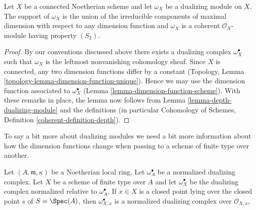 \begin{lemma}
\label{lemma-dualizing-module}
Let $X$ be a connected Noetherian scheme and let $\omega_X$ be a dualizing
module on $X$. The support of $\omega_X$ is the union of the irreducible
components of maximal dimension with respect to any dimension function
and $\omega_X$ is a coherent $\mathcal{O}_X$-module having property $(S_2)$.
\end{lemma}

\begin{proof}
By our conventions discussed above there exists a dualizing complex
$\omega_X^\bullet$ such that $\omega_X$ is the leftmost nonvanishing
cohomology sheaf. Since $X$ is connected, any two dimension functions
differ by a constant
(Topology, Lemma \ref{topology-lemma-dimension-function-unique}).
Hence we may use the
dimension function associated to $\omega_X^\bullet$
(Lemma \ref{lemma-dimension-function-scheme}).
With these remarks in place, the lemma now
follows from Lemma \ref{lemma-depth-dualizing-module}
and the definitions (in particular
Cohomology of Schemes, Definition \ref{coherent-definition-depth}).
\end{proof}

\noindent
To say a bit more about dualizing modules we need a bit more information
about how the dimension functions change when passing to a scheme
of finite type over another.

\begin{lemma}
\label{lemma-good-dualizing-normalized}
Let $(A, \mathfrak m, \kappa)$ be a Noetherian local ring.
Let $\omega_A^\bullet$ be a normalized dualizing complex.
Let $X$ be a scheme of finite type over $A$ and let
$\omega_X^\bullet$ be the dualizing complex normalized relative
to $\omega_A^\bullet$. If $x \in X$ is a closed point
lying over the closed point $s$ of $S = \Spec(A)$, then
$\omega_{X, x}^\bullet$
is a normalized dualizing complex over $\mathcal{O}_{X, x}$,
\end{lemma}

